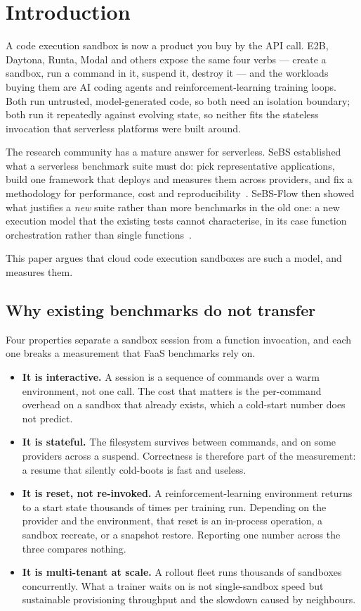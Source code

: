 \section{Introduction}
\label{sec:introduction}

A code execution sandbox is now a product you buy by the API call. E2B,
Daytona, Runta, Modal and others expose the same four verbs --- create a
sandbox, run a command in it, suspend it, destroy it --- and the workloads
buying them are AI coding agents and reinforcement-learning training loops.
Both run untrusted, model-generated code, so both need an isolation boundary;
both run it repeatedly against evolving state, so neither fits the stateless
invocation that serverless platforms were built around.

The research community has a mature answer for serverless. SeBS established
what a serverless benchmark suite must do: pick representative applications,
build one framework that deploys and measures them across providers, and fix a
methodology for performance, cost and reproducibility~\cite{sebs2021}.
SeBS-Flow then showed what justifies a \emph{new} suite rather than more
benchmarks in the old one: a new execution model that the existing tests cannot
characterise, in its case function orchestration rather than single
functions~\cite{sebsflow2025}.

This paper argues that cloud code execution sandboxes are such a model, and
measures them.

\subsection*{Why existing benchmarks do not transfer}

Four properties separate a sandbox session from a function invocation, and each
one breaks a measurement that FaaS benchmarks rely on.

\begin{itemize}
  \item \textbf{It is interactive.} A session is a sequence of commands over a
  warm environment, not one call. The cost that matters is the per-command
  overhead on a sandbox that already exists, which a cold-start number does not
  predict.
  \item \textbf{It is stateful.} The filesystem survives between commands, and
  on some providers across a suspend. Correctness is therefore part of the
  measurement: a resume that silently cold-boots is fast and useless.
  \item \textbf{It is reset, not re-invoked.} A reinforcement-learning
  environment returns to a start state thousands of times per training run.
  Depending on the provider and the environment, that reset is an in-process
  operation, a sandbox recreate, or a snapshot restore. Reporting one number
  across the three compares nothing.
  \item \textbf{It is multi-tenant at scale.} A rollout fleet runs thousands of
  sandboxes concurrently. What a trainer waits on is not single-sandbox speed
  but sustainable provisioning throughput and the slowdown caused by
  neighbours.
\end{itemize}

